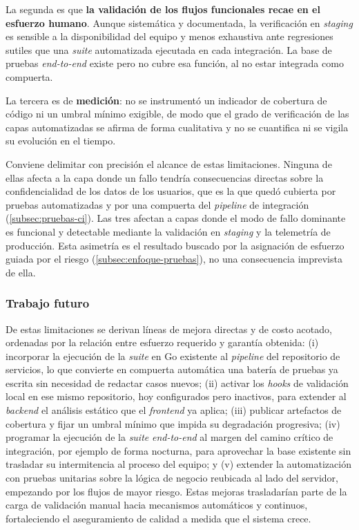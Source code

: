 La segunda es que \textbf{la validación de los flujos funcionales recae en el esfuerzo humano}. Aunque sistemática y documentada, la verificación en \textit{staging} es sensible a la disponibilidad del equipo y menos exhaustiva ante regresiones sutiles que una \textit{suite} automatizada ejecutada en cada integración. La base de pruebas \textit{end-to-end} existe pero no cubre esa función, al no estar integrada como compuerta.

La tercera es de \textbf{medición}: no se instrumentó un indicador de cobertura de código ni un umbral mínimo exigible, de modo que el grado de verificación de las capas automatizadas se afirma de forma cualitativa y no se cuantifica ni se vigila su evolución en el tiempo.

Conviene delimitar con precisión el alcance de estas limitaciones. Ninguna de ellas afecta a la capa donde un fallo tendría consecuencias directas sobre la confidencialidad de los datos de los usuarios, que es la que quedó cubierta por pruebas automatizadas y por una compuerta del \textit{pipeline} de integración (\autoref{subsec:pruebas-ci}). Las tres afectan a capas donde el modo de fallo dominante es funcional y detectable mediante la validación en \textit{staging} y la telemetría de producción. Esta asimetría es el resultado buscado por la asignación de esfuerzo guiada por el riesgo (\autoref{subsec:enfoque-pruebas}), no una consecuencia imprevista de ella.

\subsubsection{Trabajo futuro}

De estas limitaciones se derivan líneas de mejora directas y de costo acotado, ordenadas por la relación entre esfuerzo requerido y garantía obtenida: (i) incorporar la ejecución de la \textit{suite} en Go existente al \textit{pipeline} del repositorio de servicios, lo que convierte en compuerta automática una batería de pruebas ya escrita sin necesidad de redactar casos nuevos; (ii) activar los \textit{hooks} de validación local en ese mismo repositorio, hoy configurados pero inactivos, para extender al \textit{backend} el análisis estático que el \textit{frontend} ya aplica; (iii) publicar artefactos de cobertura y fijar un umbral mínimo que impida su degradación progresiva; (iv) programar la ejecución de la \textit{suite} \textit{end-to-end} al margen del camino crítico de integración, por ejemplo de forma nocturna, para aprovechar la base existente sin trasladar su intermitencia al proceso del equipo; y (v) extender la automatización con pruebas unitarias sobre la lógica de negocio reubicada al lado del servidor, empezando por los flujos de mayor riesgo. Estas mejoras trasladarían parte de la carga de validación manual hacia mecanismos automáticos y continuos, fortaleciendo el aseguramiento de calidad a medida que el sistema crece.
